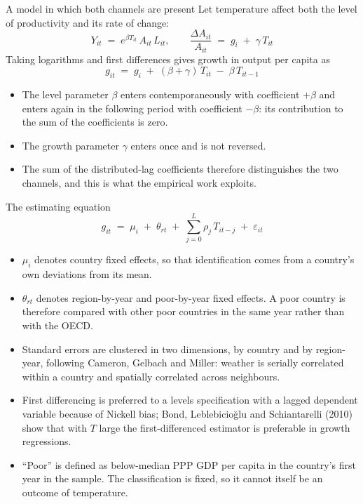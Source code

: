 \documentclass[aspectratio=169,10pt]{beamer}
\begin{document}
\begin{frame}{A model in which both channels are present}
  Let temperature affect both the level of productivity and its rate of change:
  \[
    Y_{it} \;=\; e^{\beta T_{it}}\, A_{it}\, L_{it},
    \qquad
    \frac{\Delta A_{it}}{A_{it}} \;=\; g_i \;+\; \gamma\, T_{it}
  \]
  Taking logarithms and first differences gives growth in output per capita as
  \[
    \boxed{\;g_{it} \;=\; g_i \;+\; (\beta + \gamma)\,T_{it} \;-\; \beta\,T_{it-1}\;}
  \]
  \begin{itemize}
    \item The level parameter $\beta$ enters contemporaneously with coefficient
          $+\beta$ and enters again in the following period with coefficient
          $-\beta$: its contribution to the sum of the coefficients is zero.
    \item The growth parameter $\gamma$ enters once and is not reversed.
    \item The sum of the distributed-lag coefficients therefore distinguishes the two
          channels, and this is what the empirical work exploits.
  \end{itemize}
\end{frame}

\begin{frame}{The estimating equation}
  \[
    g_{it} \;=\; \mu_i \;+\; \theta_{rt}
    \;+\; \sum_{j=0}^{L} \rho_j\, T_{it-j} \;+\; \varepsilon_{it}
  \]
  \small
  \begin{itemize}
    \item $\mu_i$ denotes country fixed effects, so that identification comes from a
          country's own deviations from its mean.
    \item $\theta_{rt}$ denotes region-by-year and poor-by-year fixed effects. A poor
          country is therefore compared with other poor countries in the same year
          rather than with the OECD.
    \item Standard errors are clustered in two dimensions, by country and by
          region-year, following Cameron, Gelbach and Miller: weather is serially
          correlated within a country and spatially correlated across neighbours.
    \item First differencing is preferred to a levels specification with a lagged
          dependent variable because of Nickell bias; Bond, Leblebicio\u{g}lu and
          Schiantarelli (2010) show that with $T$ large the first-differenced
          estimator is preferable in growth regressions.
    \item ``Poor'' is defined as below-median PPP GDP per capita in the country's
          first year in the sample. The classification is fixed, so it cannot itself
          be an outcome of temperature.
  \end{itemize}
\end{frame}
\end{document}
